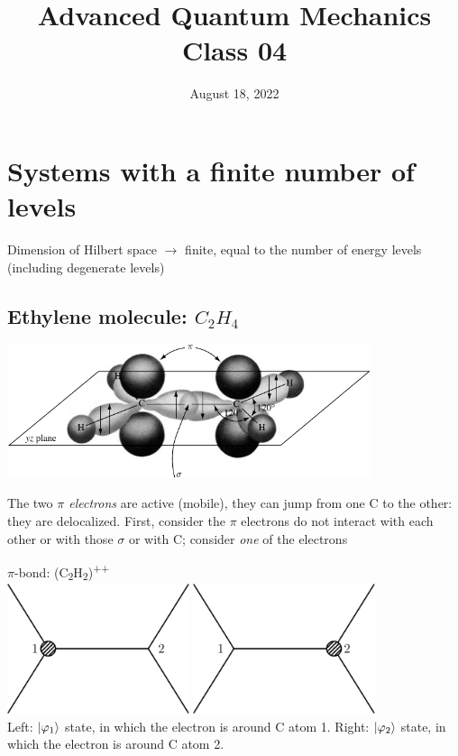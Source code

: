 \documentclass[12pt]{article}
\title{Advanced Quantum Mechanics\\Class 04}
\date{August 18, 2022}                                           %
\begin{document}
\maketitle

\setcounter{section}{3}

\section{Systems with a finite number of levels}


Dimension of Hilbert space \(\rightarrow\) finite, equal to
the number of energy levels (including degenerate
levels)

\subsection{Ethylene molecule: $C_2H_4$}

\begin{center}
\includegraphics[width=0.8\textwidth]{Figures/ethylene.pdf}
\end{center}

The two \emph{$\pi$ electrons} are active (mobile), they can
jump from one C to the other: they are delocalized.
First, consider the $\pi$ electrons do not interact with each
other or with those $\sigma$ or with C; consider \emph{one} of the electrons

\begin{center}
$\pi$-bond: (C\textsubscript{2}H\textsubscript{2})\textsuperscript{++}\\[2ex]
\quad
\includegraphics[width=0.4\textwidth]{Figures/electronAroundCAtom1.pdf}\hfill
\includegraphics[width=0.4\textwidth]{Figures/electronAroundCAtom2.pdf}
\quad\\
Left: $\ket{\varphi_1}$ state, in which the electron is around C atom 1.
Right: $\ket{\varphi_2}$ state, in which the electron is around C atom 2.
\end{center}
\end{document}
